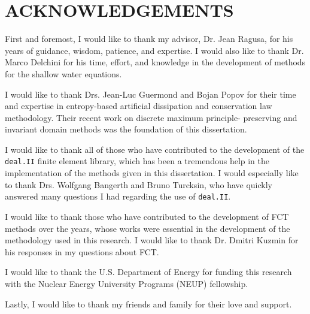 \chapter*{ACKNOWLEDGEMENTS}

\indent
First and foremost, I would like to thank my advisor, Dr. Jean Ragusa,
for his years of guidance, wisdom, patience, and expertise. I would also like to
thank Dr. Marco Delchini for his time, effort, and
knowledge in the development of methods for the shallow water equations.

I would like to thank Drs. Jean-Luc Guermond and Bojan Popov for their
time and expertise in entropy-based artificial dissipation and
conservation law methodology. Their recent work on discrete maximum principle-
preserving and invariant domain methods was the foundation of this dissertation.

I would like to thank all of those who have contributed to the
development of the \texttt{deal.II} finite element library, which has been
a tremendous help in the implementation of the methods given in this
dissertation. I would especially like to thank Drs. Wolfgang Bangerth
and Bruno Turcksin, who have quickly answered many questions I had regarding
the use of \texttt{deal.II}.

I would like to thank those who have contributed to the development
of FCT methods over the years, whose works were essential in the development
of the methodology used in this research. I would like to thank Dr. Dmitri Kuzmin
for his responses in my questions about FCT.

I would like to thank the U.S. Department of Energy for funding
this research with the Nuclear Energy University Programs (NEUP)
fellowship.

Lastly, I would like to thank my friends and family for their love and support.

\pagebreak{}
